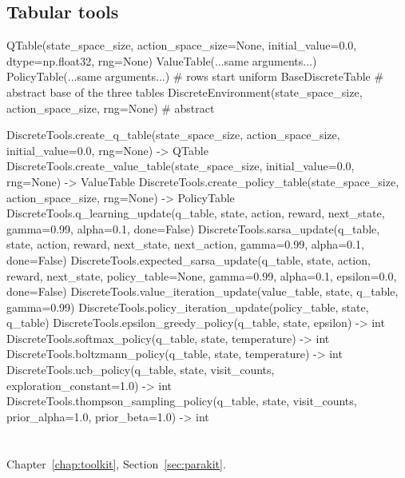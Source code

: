 \subsection{Tabular tools}

\begin{pycode}
QTable(state_space_size, action_space_size=None, initial_value=0.0,
       dtype=np.float32, rng=None)
ValueTable(...same arguments...)
PolicyTable(...same arguments...)          # rows start uniform
BaseDiscreteTable                          # abstract base of the three tables
DiscreteEnvironment(state_space_size, action_space_size, rng=None)   # abstract

DiscreteTools.create_q_table(state_space_size, action_space_size,
                             initial_value=0.0, rng=None) -> QTable
DiscreteTools.create_value_table(state_space_size, initial_value=0.0,
                                 rng=None) -> ValueTable
DiscreteTools.create_policy_table(state_space_size, action_space_size,
                                  rng=None) -> PolicyTable
DiscreteTools.q_learning_update(q_table, state, action, reward, next_state,
                                gamma=0.99, alpha=0.1, done=False)
DiscreteTools.sarsa_update(q_table, state, action, reward, next_state,
                           next_action, gamma=0.99, alpha=0.1, done=False)
DiscreteTools.expected_sarsa_update(q_table, state, action, reward, next_state,
                                    policy_table=None, gamma=0.99, alpha=0.1,
                                    epsilon=0.0, done=False)
DiscreteTools.value_iteration_update(value_table, state, q_table, gamma=0.99)
DiscreteTools.policy_iteration_update(policy_table, state, q_table)
DiscreteTools.epsilon_greedy_policy(q_table, state, epsilon) -> int
DiscreteTools.softmax_policy(q_table, state, temperature) -> int
DiscreteTools.boltzmann_policy(q_table, state, temperature) -> int
DiscreteTools.ucb_policy(q_table, state, visit_counts,
                         exploration_constant=1.0) -> int
DiscreteTools.thompson_sampling_policy(q_table, state, visit_counts,
                                       prior_alpha=1.0, prior_beta=1.0) -> int
\end{pycode}

\section{\texorpdfstring{}{toolkit.parakit}}\label{sec:api-parakit}

Chapter~\ref{chap:toolkit}, Section~\ref{sec:parakit}.

